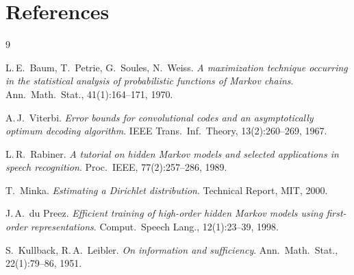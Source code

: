 \documentclass[10pt,a4paper,twocolumn]{article}
\begin{document}
\section*{References}

{\footnotesize
\begin{thebibliography}{9}
\setlength{\itemsep}{1pt}

L.\,E.\ Baum, T.\ Petrie, G.\ Soules, N.\ Weiss.
\textit{A maximization technique occurring in the statistical analysis of
probabilistic functions of Markov chains}.
Ann.\ Math.\ Stat., 41(1):164--171, 1970.

A.\,J.\ Viterbi.
\textit{Error bounds for convolutional codes and an asymptotically
optimum decoding algorithm}.
IEEE Trans.\ Inf.\ Theory, 13(2):260--269, 1967.

L.\,R.\ Rabiner.
\textit{A tutorial on hidden Markov models and selected applications in
speech recognition}.
Proc.\ IEEE, 77(2):257--286, 1989.

T.\ Minka.
\textit{Estimating a Dirichlet distribution}.
Technical Report, MIT, 2000.

J.\,A.\ du Preez.
\textit{Efficient training of high-order hidden Markov models using
first-order representations}.
Comput.\ Speech Lang., 12(1):23--39, 1998.

S.\ Kullback, R.\,A.\ Leibler.
\textit{On information and sufficiency}.
Ann.\ Math.\ Stat., 22(1):79--86, 1951.

\end{thebibliography}
}
\end{document}
